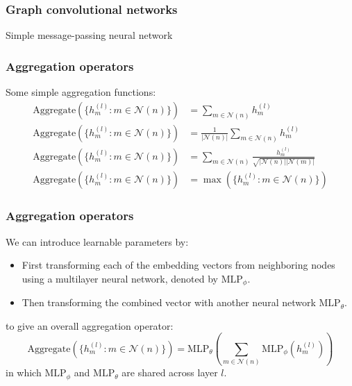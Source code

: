 \documentclass{beamer}
\begin{document}
\begin{frame}
    \frametitle{Graph convolutional networks}
    \begin{algorithm}[H]
        \caption{Simple message-passing neural network}
        \;
    \end{algorithm}
\end{frame}

\begin{frame}
    \frametitle{Aggregation operators}
    Some simple aggregation functions:
    \begin{align*}
        \mathrm{Aggregate}(\{h^{(l)}_{m}:m\in\mathcal{N}(n)\})&=\sum_{m\in\mathcal{N}(n)}h^{(l)}_{m} \\
        \mathrm{Aggregate}(\{h^{(l)}_{m}:m\in\mathcal{N}(n)\})&=\frac{1}{|\mathcal{N}(n)|}\sum_{m\in\mathcal{N}(n)}h^{(l)}_{m} \\
        \mathrm{Aggregate}(\{h^{(l)}_{m}:m\in\mathcal{N}(n)\})&=\sum_{m\in\mathcal{N}(n)}\frac{h^{(l)}_{m}}{\sqrt{|\mathcal{N}(n)||\mathcal{N}(m)|}} \\
        \mathrm{Aggregate}(\{h^{(l)}_{m}:m\in\mathcal{N}(n)\})&=\max(\{h^{(l)}_{m}:m\in\mathcal{N}(n)\})
    \end{align*}
\end{frame}

\begin{frame}
    \frametitle{Aggregation operators}
    We can introduce learnable parameters by:
    \begin{itemize}
        \item First transforming each of the embedding vectors from neighboring nodes using a multilayer neural network, denoted by $\mathrm{MLP}_{\phi}$.
        \item Then transforming the combined vector with another neural network $\mathrm{MLP}_{\theta}$.
    \end{itemize}
    to give an overall aggregation operator:
    \begin{equation*}
        \mathrm{Aggregate}(\{h^{(l)}_{m}:m\in\mathcal{N}(n)\})=\mathrm{MLP}_{\theta}(\sum_{m\in\mathcal{N}(n)}\mathrm{MLP}_{\phi}(h^{(l)}_{m}))
    \end{equation*}
    in which $\mathrm{MLP}_{\phi}$ and $\mathrm{MLP}_{\theta}$ are shared across layer $l$.
\end{frame}
\end{document}
